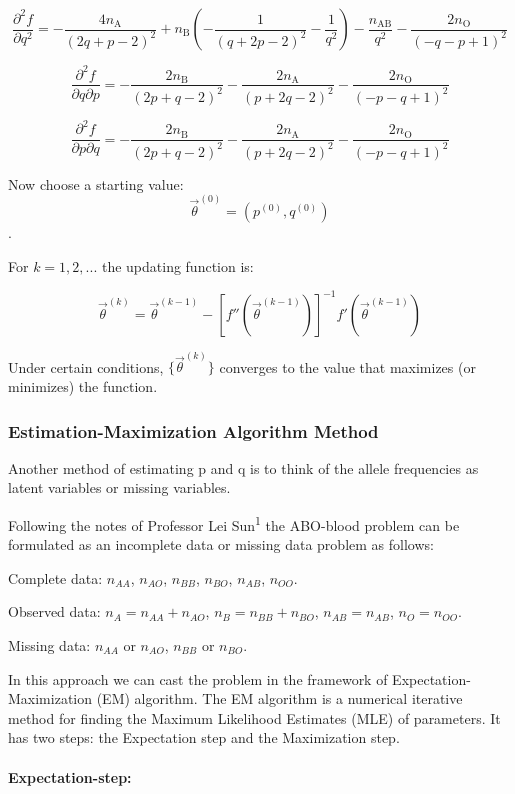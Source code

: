 \documentclass[]{article}
\let\oldparagraph\paragraph
\renewcommand{\paragraph}[1]{\oldparagraph{#1}\mbox{}}
\begin{document}
\[ \frac{\partial^2 f}{\partial q^2} = -\dfrac{4n_\text{A}}{\left(2q+p-2\right)^2}+n_\text{B}\left(-\dfrac{1}{\left(q+2p-2\right)^2}-\dfrac{1}{q^2}\right)-\dfrac{n_\text{AB}}{q^2}-\dfrac{2n_\text{O}}{\left(-q-p+1\right)^2}
\]

\[\frac{\partial^2 f}{\partial q \partial p } = -\dfrac{2n_\text{B}}{\left(2p+q-2\right)^2}-\dfrac{2n_\text{A}}{\left(p+2q-2\right)^2}-\dfrac{2n_\text{O}}{\left(-p-q+1\right)^2}
\]

\[\frac{\partial^2 f}{\partial p \partial q } =-\dfrac{2n_\text{B}}{\left(2p+q-2\right)^2}-\dfrac{2n_\text{A}}{\left(p+2q-2\right)^2}-\dfrac{2n_\text{O}}{\left(-p-q+1\right)^2}
\]

Now choose a starting value:
\[\vec \theta ^{(0)} = (p^{(0)}, q^{(0)})\].

For \(k=1,2,...\) the updating function is:

\[\vec \theta^{(k)} = \vec \theta^{(k-1)} 
- [f''(\vec \theta^{(k-1)})]^{-1} f'(\vec \theta^{(k-1)})\]

Under certain conditions, \(\{\vec \theta^{(k)}\}\) converges to the
value that maximizes (or minimizes) the function.

\subsubsection{Estimation-Maximization Algorithm
Method}\label{estimation-maximization-algorithm-method}

Another method of estimating p and q is to think of the allele
frequencies as latent variables or missing variables.

Following the notes of Professor Lei Sun\textsuperscript{1} the
ABO-blood problem can be formulated as an incomplete data or missing
data problem as follows:

Complete data: \(n_{AA}\), \(n_{AO}\), \(n_{BB}\), \(n_{BO}\),
\(n_{AB}\), \(n_{OO}\).

Observed data: \(n_A=n_{AA}+n_{AO}\), \(n_B=n_{BB}+n_{BO}\),
\(n_{AB}=n_{AB}\), \(n_{O}=n_{OO}\).

Missing data: \(n_{AA}\) or \(n_{AO}\), \(n_{BB}\) or \(n_{BO}\).

In this approach we can cast the problem in the framework of
Expectation-Maximization (EM) algorithm. The EM algorithm is a numerical
iterative method for finding the Maximum Likelihood Estimates (MLE) of
parameters. It has two steps: the Expectation step and the Maximization
step.

\paragraph{Expectation-step:}\label{expectation-step}
\end{document}
